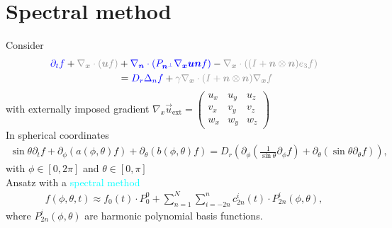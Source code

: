 \section{Spectral method}
\begin{frame}
	\scriptsize
	Consider 
	\begin{align}
		\textcolor{blue}{\partial_t f}+ \textcolor{gray!80}{\nabla_{\boldsymbol{x}} \cdot(\boldsymbol{u} f)} & +\textcolor{blue}{\nabla_{\boldsymbol{n}} \cdot\left(P_{\boldsymbol{n}^{\perp}} \nabla_{\boldsymbol{x}} \boldsymbol{u} \boldsymbol{n} f\right)}-\textcolor{gray!80}{\nabla_{\boldsymbol{x}} \cdot\left((I+\boldsymbol{n} \otimes \boldsymbol{n}) e_3 f\right)} \notag \\
		& = \textcolor{blue}{D_r \Delta_n f}+\textcolor{gray!80}{\gamma \nabla_{\boldsymbol{x}} \cdot(I+\boldsymbol{n} \otimes \boldsymbol{n}) \nabla_{\boldsymbol{x}} f} \label{SmochEq_kurz}
	\end{align}
    with externally imposed gradient $\nabla_x \vec{u}_{\mathrm{ext}} = \left(\begin{array}{lll}
    	u_{x} & u_{y} & u_{z} \\
    	v_{x} & v_{y} & v_{z} \\
    	w_{x} & w_{y} & w_{z}
    \end{array}\right)$\\
	\vspace{12pt}
	\pause
	In spherical coordinates
	\begin{align}
		\sin \theta \partial_t f + \partial_\phi\left(a(\phi, \theta) f\right)+\partial_\theta\left(b(\phi, \theta) f\right) = D_r \left(\partial_\phi\left(\frac{1}{\sin \theta} \partial_\phi f\right)+\partial_\theta\left(\sin \theta \partial_\theta f\right)\right), \label{Smochluch_S2}
	\end{align}
	with $\phi \in [0, 2 \pi]$ and $\theta \in [0, \pi]$ \\
	\vspace{12pt}
	\pause
   	Ansatz with a \textcolor{cyan}{spectral method}
	\begin{align}
		f(\phi, \theta, t) \approx f_0(t) \cdot P_0^0 + \sum_{n=1}^{N} \sum_{i=-2n}^{n} c^i_{2n}(t) \cdot P^i_{2n}(\phi, \theta), \label{ansatz}
	\end{align}
	where $P^i_{2n}(\phi, \theta)$ are harmonic polynomial basis functions. %
\end{frame}


